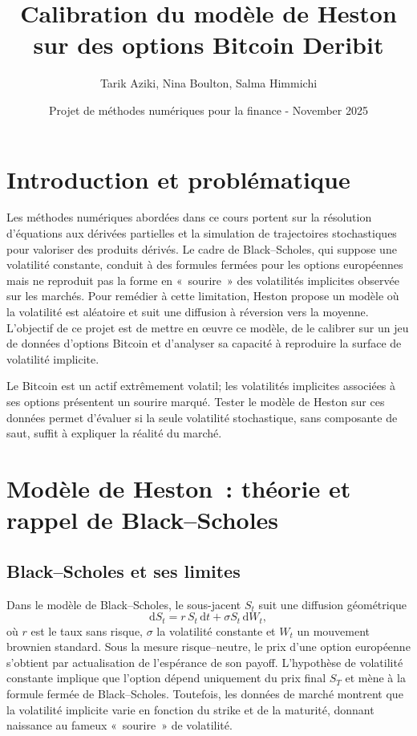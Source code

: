 \documentclass[12pt,a4paper]{article}
\title{Calibration du modèle de Heston sur des options Bitcoin Deribit}
\date{Projet de méthodes numériques pour la finance - November 2025}
\author{Tarik Aziki, Nina Boulton, Salma Himmichi}
\begin{document}
\maketitle

\section{Introduction et problématique}

Les méthodes numériques abordées dans ce cours portent sur la résolution d'équations aux dérivées partielles et la simulation de trajectoires stochastiques pour valoriser des produits dérivés.  Le cadre de Black--Scholes, qui suppose une volatilité constante, conduit à des formules fermées pour les options européennes mais ne reproduit pas la forme en « sourire » des volatilités implicites observée sur les marchés\cite{bs_limite}.  Pour remédier à cette limitation, Heston propose un modèle où la volatilité est aléatoire et suit une diffusion à réversion vers la moyenne.  L'objectif de ce projet est de mettre en œuvre ce modèle, de le calibrer sur un jeu de données d'options Bitcoin et d'analyser sa capacité à reproduire la surface de volatilité implicite.

Le Bitcoin est un actif extrêmement volatil; les volatilités implicites associées à ses options présentent un sourire marqué.  Tester le modèle de Heston sur ces données permet d'évaluer si la seule volatilité stochastique, sans composante de saut, suffit à expliquer la réalité du marché.

\section{Modèle de Heston : théorie et rappel de Black--Scholes}

\subsection{Black--Scholes et ses limites}

Dans le modèle de Black--Scholes, le sous-jacent $S_t$ suit une diffusion géométrique
\begin{equation}
  \mathrm{d}S_t = r \, S_t \, \mathrm{d}t + \sigma S_t \, \mathrm{d}W_t,
\end{equation}
où $r$ est le taux sans risque, $\sigma$ la volatilité constante et $W_t$ un mouvement brownien standard.  Sous la mesure risque--neutre, le prix d'une option européenne s'obtient par actualisation de l'espérance de son payoff.  L'hypothèse de volatilité constante implique que l'option dépend uniquement du prix final $S_T$ et mène à la formule fermée de Black--Scholes.  Toutefois, les données de marché montrent que la volatilité implicite varie en fonction du strike et de la maturité, donnant naissance au fameux « sourire » de volatilité.
\end{document}
